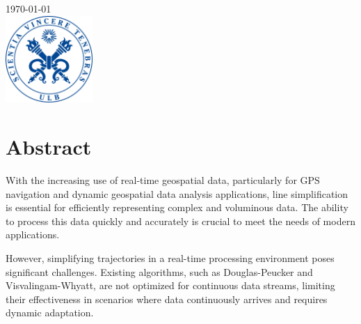 \documentclass[twoside,12pt, a4paper]{report}
\begin{document}
\begin{titlepage}

{\large \today}\\[1cm] %


\includegraphics[width=3.3cm, height=3.3cm]{sceau-a-quadri.jpg}%
 

\end{titlepage}


\section*{Abstract}
With the increasing use of real-time geospatial data, particularly for GPS navigation and dynamic geospatial data analysis applications, line simplification is essential for efficiently representing complex and voluminous data. The ability to process this data quickly and accurately is crucial to meet the needs of modern applications.

However, simplifying trajectories in a real-time processing environment poses significant challenges. Existing algorithms, such as Douglas-Peucker and Visvalingam-Whyatt, are not optimized for continuous data streams, limiting their effectiveness in scenarios where data continuously arrives and requires dynamic adaptation.
\end{document}
